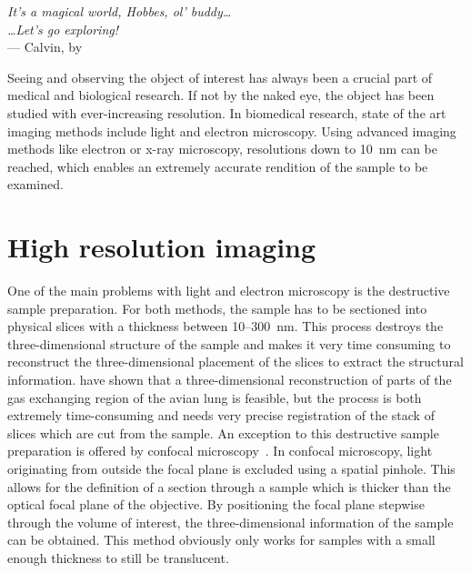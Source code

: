 \acresetall
{}\label{ch:Introduction}
\begin{flushright}{\slshape
		It's a magical world, Hobbes, ol' buddy\ldots\\
		\ldots Let's go exploring!}\\ \medskip
		--- Calvin, by \citep{Watterson1996}
\end{flushright}
\vspace{52mm}

Seeing and observing the object of interest has always been a crucial part of medical and biological research. If not by the naked eye, the object has been studied with ever-increasing resolution. In biomedical research, state of the art imaging methods include light and electron microscopy. Using advanced imaging methods like electron or x-ray microscopy, resolutions down to \SI{10}{\nano\meter}  can be reached, which enables an extremely accurate rendition of the sample to be examined.

\section{High resolution imaging}
One of the main problems with light and electron microscopy is the destructive sample preparation. For both methods, the sample has to be sectioned into physical slices with a thickness between 10--\SI{300}{\nano\meter}. This process destroys the three-dimensional structure of the sample and makes it very time consuming to reconstruct the three-dimensional placement of the slices to extract the structural information. \citet{Woodward2005} have shown that a three-dimensional reconstruction of parts of the gas exchanging region of the avian lung is feasible, but the process is both extremely time-consuming and needs very precise registration of the stack of slices which are cut from the sample. An exception to this destructive sample preparation is offered by confocal microscopy~\cite{Minsky1961}. In confocal microscopy, light originating from outside the focal plane is excluded using a spatial pinhole. This allows for the definition of a section through a sample which is thicker than the optical focal plane of the objective. By positioning the focal plane stepwise through the volume of interest, the three-dimensional information of the sample can be obtained. This method obviously only works for samples with a small enough thickness to still be translucent.

